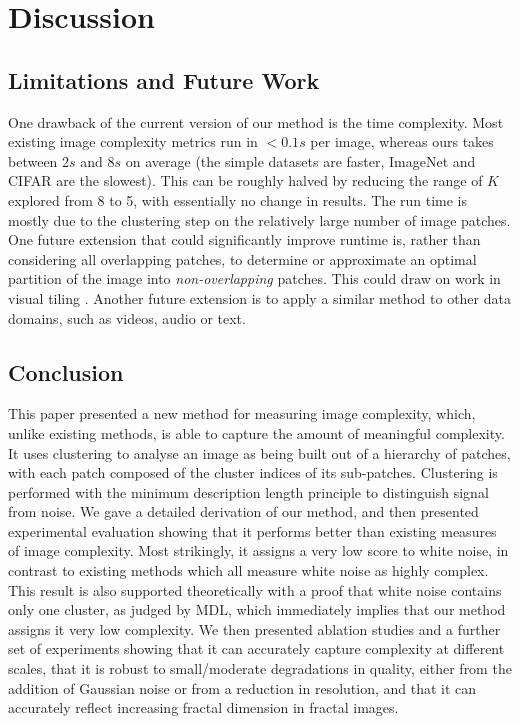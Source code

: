 \documentclass[a4paper,fleqn]{cas-sc}
\theoremstyle{remark}
\begin{document}
\section{Discussion} \label{sec:conclusion}
\subsection{Limitations and Future Work}
One drawback of the current version of our method is the time complexity. Most existing image complexity metrics run in $<0.1s$ per image, whereas ours takes between $2s$ and $8s$ on average (the simple datasets are faster, ImageNet and CIFAR are the slowest). This can be roughly halved by reducing the range of $K$ explored from 8 to 5, with essentially no change in results. The run time is mostly due to the clustering step on the relatively large number of image patches. One future extension that could significantly improve runtime is, rather than considering all overlapping patches, to determine or approximate an optimal partition of the image into \emph{non-overlapping} patches. This could draw on work in visual tiling \citep{xiao2017optile}. Another future extension is to apply a similar method to other data domains, such as videos, audio or text.

\subsection{Conclusion}
This paper presented a new method for measuring image complexity, which, unlike existing methods, is able to capture the amount of meaningful complexity.
It uses clustering to analyse an image as being built out of a hierarchy of patches, with each patch composed of the cluster indices of its sub-patches. Clustering is performed with the minimum description length principle to distinguish signal from noise. We gave a detailed derivation of our method, and then presented experimental evaluation showing that it performs better than existing measures of image complexity. Most strikingly, it assigns a very low score to white noise, in contrast to existing methods which all measure white noise as highly complex. This result is also supported theoretically with a proof that white noise contains only one cluster, as judged by MDL, which immediately implies that our method assigns it very low complexity. We then presented ablation studies 
and a further set of experiments showing that it can accurately capture complexity at different scales, that it is robust to small/moderate degradations in quality, either from the addition of Gaussian noise or from a reduction in resolution, and that it can accurately reflect increasing fractal dimension in fractal images. 
\end{document}
